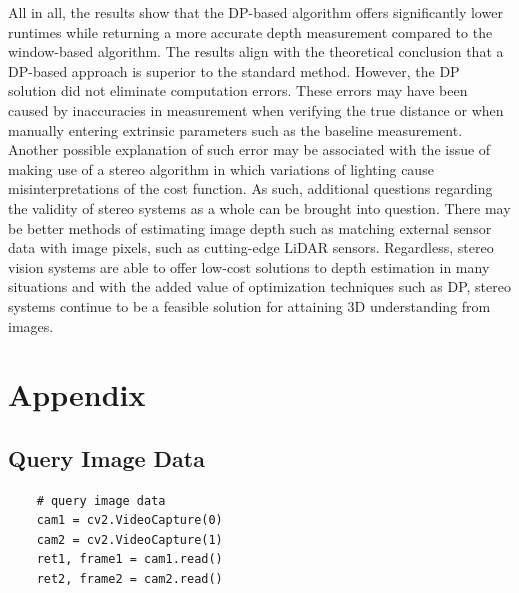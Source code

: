 \documentclass[11pt]{scrartcl}
\begin{document}
All in all, the results show that the DP-based algorithm offers significantly lower runtimes while returning a more accurate depth measurement compared to the window-based algorithm. The results align with the theoretical conclusion that a DP-based approach is superior to the standard method. However, the DP solution did not eliminate computation errors. These errors may have been caused by inaccuracies in measurement when verifying the true distance or when manually entering extrinsic parameters such as the baseline measurement. Another possible explanation of such error may be associated with the issue of making use of a stereo algorithm in which variations of lighting cause misinterpretations of the cost function. As such, additional questions regarding the validity of stereo systems as a whole can be brought into question. There may be better methods of estimating image depth such as matching external sensor data with image pixels, such as cutting-edge LiDAR sensors. Regardless, stereo vision systems are able to offer low-cost solutions to depth estimation in many situations and with the added value of optimization techniques such as DP, stereo systems continue to be a feasible solution for attaining 3D understanding from images.  



\section{Appendix}

\subsection{Query Image Data}
\begin{verbatim}
	# query image data
	cam1 = cv2.VideoCapture(0)
	cam2 = cv2.VideoCapture(1)
	ret1, frame1 = cam1.read()
	ret2, frame2 = cam2.read()
\end{verbatim}
\end{document}
